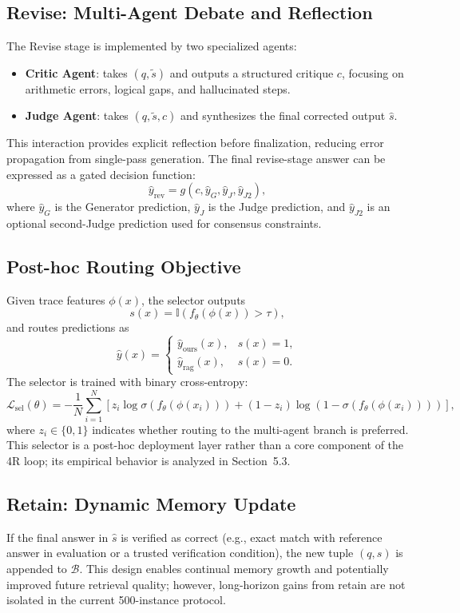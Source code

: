 \subsection{Revise: Multi-Agent Debate and Reflection}
The Revise stage is implemented by two specialized agents:
\begin{itemize}
  \item \textbf{Critic Agent}: takes $(q,\tilde{s})$ and outputs a structured critique $c$, focusing on arithmetic errors, logical gaps, and hallucinated steps.
  \item \textbf{Judge Agent}: takes $(q,\tilde{s},c)$ and synthesizes the final corrected output $\hat{s}$.
\end{itemize}
This interaction provides explicit reflection before finalization, reducing error propagation from single-pass generation.
The final revise-stage answer can be expressed as a gated decision function:
\[
\hat{y}_{\text{rev}} = g\!\left(c,\hat{y}_G,\hat{y}_J,\hat{y}_{J2}\right),
\]
where $\hat{y}_G$ is the Generator prediction, $\hat{y}_J$ is the Judge prediction, and $\hat{y}_{J2}$ is an optional second-Judge prediction used for consensus constraints.

\subsection{Post-hoc Routing Objective}
Given trace features $\phi(x)$, the selector outputs
\[
s(x)=\mathbb{I}\!\left(f_\theta(\phi(x))>\tau\right),
\]
and routes predictions as
\[
\hat{y}(x)=
\begin{cases}
\hat{y}_{\text{ours}}(x), & s(x)=1,\\
\hat{y}_{\text{rag}}(x), & s(x)=0.
\end{cases}
\]
The selector is trained with binary cross-entropy:
\[
\mathcal{L}_{\text{sel}}(\theta)=
-\frac{1}{N}\sum_{i=1}^{N}
\left[
z_i\log \sigma\!\left(f_\theta(\phi(x_i))\right)
+(1-z_i)\log\!\left(1-\sigma\!\left(f_\theta(\phi(x_i))\right)\right)
\right],
\]
where $z_i\in\{0,1\}$ indicates whether routing to the multi-agent branch is preferred.
This selector is a post-hoc deployment layer rather than a core component of the 4R loop; its empirical behavior is analyzed in Section~5.3.

\subsection{Retain: Dynamic Memory Update}
If the final answer in $\hat{s}$ is verified as correct (e.g., exact match with reference answer in evaluation or a trusted verification condition), the new tuple $(q,\hat{s})$ is appended to $\mathcal{B}$. This design enables continual memory growth and potentially improved future retrieval quality; however, long-horizon gains from retain are not isolated in the current 500-instance protocol.

